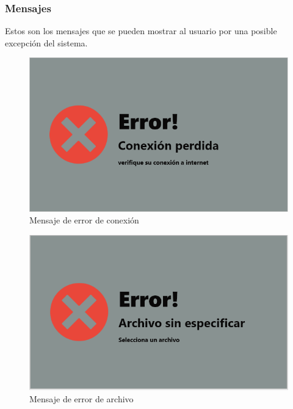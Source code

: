 \subsubsection{Mensajes}
\noindent Estos son los mensajes que se pueden mostrar al usuario por una posible excepción del sistema. 
\begin{figure}[H]
    \centering
    \includegraphics[scale=0.4]{Capitulo2/images/UI/9_error_conexion.PNG}
    \caption{Mensaje de error de conexión}
    \label{Mensaje_error}
\end{figure}
\begin{figure}[H]
    \centering
    \includegraphics[scale=0.4]{Capitulo2/images/UI/10_error_archivo.PNG}
    \caption{Mensaje de error de archivo}
    \label{error_de_Arch}
\end{figure}
